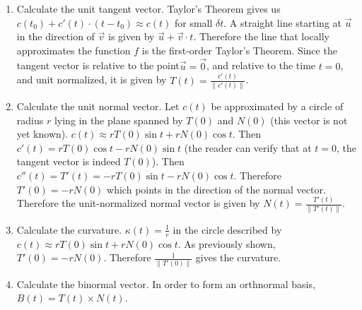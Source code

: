 \begin{enumerate}


\item Calculate the unit tangent vector. Taylor's Theorem gives us \(c(t_0) + c'(t) \cdot (t - t_0) \approx c(t)\) for small \(\delta t\). A straight line starting at \(\vec{u}\) in the direction of \(\vec{v}\) is given by \(\vec{u} + \vec{v} \cdot t\). Therefore the line that locally approximates the function \(f\) is the first-order Taylor's Theorem. Since the tangent vector is relative to the point\(\vec{u} = \vec{0}\), and relative to the time \(t = 0\), and unit normalized, it is given by \(T(t) = \frac{c'(t)}{\|c'(t)\|}\).

\item Calculate the unit normal vector. Let \(c(t)\) be approximated by a circle of radius \(r\) lying in the plane spanned by \(T(0)\) and \(N(0)\) (this vector is not yet known). \(c(t) \approx r T(0) \sin t + r N(0) \cos t\). Then \(c'(t) = r T(0) \cos t - r N(0) \sin t\) (the reader can verify that at \(t = 0\), the tangent vector is indeed \(T(0)\)). Then \(c''(t) = T'(t) = - r T(0) \sin t - r N(0) \cos t\). Therefore \(T'(0) = -rN(0)\) which points in the direction of the normal vector. Therefore the unit-normalized normal vector is given by \(N(t) = \frac{T'(t)}{\|T'(t)\|}\). %

\item Calculate the curvature. \(\kappa(t) = \frac{1}{r}\) in the circle described by \(c(t) \approx r T(0) \sin t + r N(0) \cos t\). As previously shown, \(T'(0) = -r N(0)\). Therefore \(\frac{1}{\|T'(0)\|}\) gives the curvature.


\item Calculate the binormal vector. In order to form an orthnormal basis, \(B(t) = T(t) \times N(t)\).


\end{enumerate}

